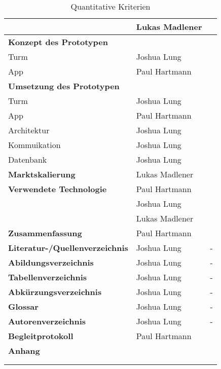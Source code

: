 \begin{longtable}{l|l|r}
                                         & Lukas Madlener &                     \\ \hline
  \textbf{Konzept des Prototypen}        &                &                     \\ \hline
  Turm                                   & Joshua Lung    &                     \\ \hline
  App                                    & Paul Hartmann  &                     \\ \hline
  \textbf{Umsetzung des Prototypen}      &                &                     \\ \hline
  Turm                                   & Joshua Lung    &                     \\ \hline
  App                                    & Paul Hartmann  &                     \\ \hline
  Architektur                            & Joshua Lung    &                     \\ \hline
  Kommuikation                           & Joshua Lung    &                     \\ \hline
  Datenbank                              & Joshua Lung    &                     \\ \hline
  \textbf{Marktskalierung}               & Lukas Madlener &                     \\ \hline
  \textbf{Verwendete Technologie}        & Paul Hartmann  &                     \\
                                         & Joshua Lung    &                     \\
                                         & Lukas Madlener &                     \\ \hline
  \textbf{Zusammenfassung}               & Paul Hartmann  &                     \\ \hline
  \textbf{Literatur-/Quellenverzeichnis} & Joshua Lung    & -                   \\ \hline
  \textbf{Abildungsverzeichnis}          & Joshua Lung    & -                   \\ \hline
  \textbf{Tabellenverzeichnis}           & Joshua Lung    & -                   \\ \hline
  \textbf{Abkürzungsverzeichnis}         & Joshua Lung    & -                   \\ \hline
  \textbf{Glossar}                       & Joshua Lung    & -                   \\ \hline
  \textbf{Autorenverzeichnis}            & Joshua Lung    & -                   \\ \hline
  \textbf{Begleitprotokoll}              & Paul Hartmann  &                     \\ \hline
  \textbf{Anhang}                        &                &                     \\ \hline

  \multicolumn{3}{c}{}                                                          \\

  \caption{Quantitative Kriterien}
  \label{tab:quantitative_kriterien}
\end{longtable}